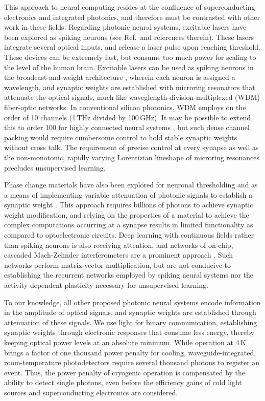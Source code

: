 \documentclass[twocolumn]{article}
\newcommand{\onlinecite}[1]{\hspace{-1 ex} \nocite{#1}\citenum{#1}}
\begin{document}
This approach to neural computing resides at the confluence of superconducting electronics and integrated photonics, and therefore must be contrasted with other work in these fields. Regarding photonic neural systems, excitable lasers have been explored as spiking neurons (see Ref.\,\onlinecite{prsh2017} and references therein). These lasers integrate several optical inputs, and release a laser pulse upon reaching threshold. These devices can be extremely fast, but consume too much power for scaling to the level of the human brain. Excitable lasers can be used as spiking neurons in the broadcast-and-weight architecture \cite{tana20142}, wherein each neuron is assigned a wavelength, and synaptic weights are established with microring resonators that attenuate the optical signals, much like  waveglength-division-multiplexed (WDM) fiber-optic networks. In conventional silicon photonics, WDM employs on the order of 10 channels (1\,THz divided by 100\,GHz). It may be possible to extend this to order 100 for highly connected neural systems \cite{tana20142}, but such dense channel packing would require cumbersome control to hold stable synaptic weights without cross talk. The requirement of precise control at every synapse as well as the non-monotonic, rapidly varying Lorentizian lineshape of microring resonances precludes unsupervised learning. 

Phase change materials have also been explored for neuronal thresholding \cite{chsa2018} and as a means of implementing variable attenuation of photonic signals to establish a synaptic weight \cite{chri2017}. This approach requires billions of photons to achieve synaptic weight modification, and relying on the properties of a material to achieve the complex computations occurring at a synapse results in limited functionality as compared to optoelectronic circuits. Deep learning with continuous fields rather than spiking neurons is also receiving attention, and networks of on-chip, cascaded Mach-Zehnder interferometers are a prominent approach \cite{shha2016}. Such networks perform matrix-vector multiplication, but are not conducive to establishing the recurrent networks employed by spiking neural systems nor the activity-dependent plasticity necessary for unsupervised learning. 

To our knowledge, all other proposed photonic neural systems encode information in the amplitude of optical signals, and synaptic weights are established through attenuation of these signals. We use light for binary communication, establishing synaptic weights through electronic responses that consume less energy, thereby keeping optical power levels at an absolute minimum. While operation at 4\,K brings a factor of one thousand power penalty for cooling, waveguide-integrated, room-temperature photodetectors require several thousand photons to register an event. Thus, the power penalty of cryogenic operation is compensated by the ability to detect single photons, even before the efficiency gains of cold light sources and superconducting electronics are considered.
\end{document}
